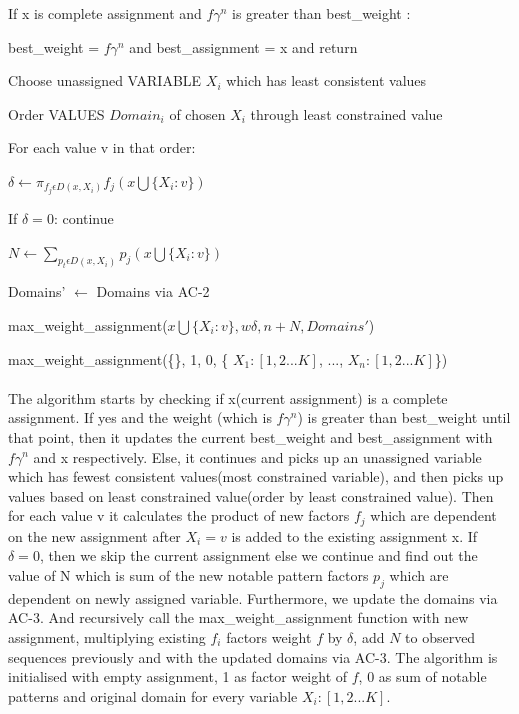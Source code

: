 \documentclass[12pt]{article}
\begin{document}
\begin{enumerate}[label=(\alph*)]
  \hspace{10mm}If x is complete assignment and $f \gamma^n$ is greater than best\_weight : 
  
  \hspace{20mm}best\_weight = $f \gamma^n$ and best\_assignment = x and return
  
  \hspace{10mm}Choose unassigned VARIABLE $X_i$ which has least consistent values
  
  \hspace{10mm}Order VALUES $Domain_i$ of chosen $X_i$ through least constrained value
  
  \hspace{10mm}For each value v in that order:
  
    \hspace{20mm}$\delta \leftarrow \pi_{f_j \epsilon D(x, X_i)} f_j(x \bigcup \{X_i: v\})$
    
    \hspace{20mm}If $\delta = 0$: continue
    
    \hspace{20mm}$N \leftarrow \sum_{p_t \epsilon D(x, X_i)} p_j(x \bigcup \{X_i: v\})$
    
    \hspace{20mm}Domains' $\leftarrow$ Domains via AC-2
    
    \hspace{20mm}max\_weight\_assignment($x \bigcup \{X_i: v\}, w\delta, n + N, Domains'$)
    
    max\_weight\_assignment(\{\}, 1, 0, \{ $X_1: [1,2...K]$, ..., $X_n: [1,2...K]$\})
    \\ \\
    The algorithm starts by checking if x(current assignment) is a complete assignment. If yes and the weight (which is $f \gamma^n$) is greater than best\_weight until that point, then it updates the current best\_weight and best\_assignment with $f\gamma^n$ and x respectively. Else, it continues and picks up an unassigned variable which has fewest consistent values(most constrained variable), and then picks up values based on least constrained value(order by least constrained value). Then for each value v it calculates the product of new factors $f_j$ which are dependent on the new assignment after $X_i = v$ is added to the existing assignment x. If $\delta = 0$, then we skip the current assignment else we continue and find out the value of N which is sum of the new notable pattern factors $p_j$ which are dependent on newly assigned variable. Furthermore, we update the domains via AC-3. And recursively call the max\_weight\_assignment function with new assignment, multiplying existing $f_i$ factors weight $f$ by $\delta$, add $N$ to observed sequences previously and with the updated domains via AC-3. The algorithm is initialised with empty assignment, 1 as factor weight of $f$, 0 as sum of notable patterns and original domain for every variable $X_i: [1,2...K]$. \\ \\
    

\end{enumerate}
\end{document}
